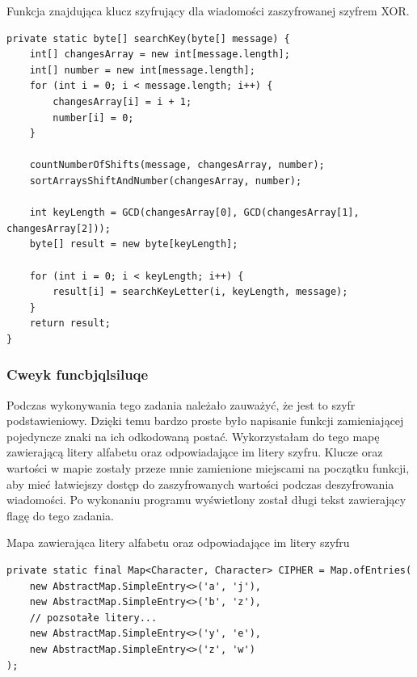 \documentclass[12pt,a4paper,titlepage]{article}
\begin{document}
\begin{listing}[H]
\caption{Funkcja znajdująca klucz szyfrujący dla wiadomości zaszyfrowanej szyfrem XOR.}
\begin{verbatim}
private static byte[] searchKey(byte[] message) {
    int[] changesArray = new int[message.length];
    int[] number = new int[message.length];
    for (int i = 0; i < message.length; i++) {
        changesArray[i] = i + 1;
        number[i] = 0;
    }

    countNumberOfShifts(message, changesArray, number);
    sortArraysShiftAndNumber(changesArray, number);

    int keyLength = GCD(changesArray[0], GCD(changesArray[1], changesArray[2]));
    byte[] result = new byte[keyLength];

    for (int i = 0; i < keyLength; i++) {
        result[i] = searchKeyLetter(i, keyLength, message);
    }
    return result;
}
\end{verbatim}
\end{listing}

\subsubsection{Cweyk funcbjqlsiluqe}
Podczas wykonywania tego zadania należało zauważyć, że jest to szyfr podstawieniowy. Dzięki temu bardzo proste było napisanie funkcji zamieniającej pojedyncze znaki na ich odkodowaną postać. Wykorzystałam do tego mapę zawierającą litery alfabetu oraz odpowiadające im litery szyfru. Klucze oraz wartości w mapie zostały przeze mnie zamienione miejscami na początku funkcji, aby mieć łatwiejszy dostęp do zaszyfrowanych wartości podczas deszyfrowania wiadomości. Po wykonaniu programu wyświetlony został długi tekst zawierający flagę do tego zadania.

\begin{listing}[H]
\caption{Mapa zawierająca litery alfabetu oraz odpowiadające im litery szyfru}
\begin{verbatim}
private static final Map<Character, Character> CIPHER = Map.ofEntries(
    new AbstractMap.SimpleEntry<>('a', 'j'),
    new AbstractMap.SimpleEntry<>('b', 'z'),
    // pozsotałe litery...
    new AbstractMap.SimpleEntry<>('y', 'e'),
    new AbstractMap.SimpleEntry<>('z', 'w')
);
\end{verbatim}
\end{listing}
\end{document}
